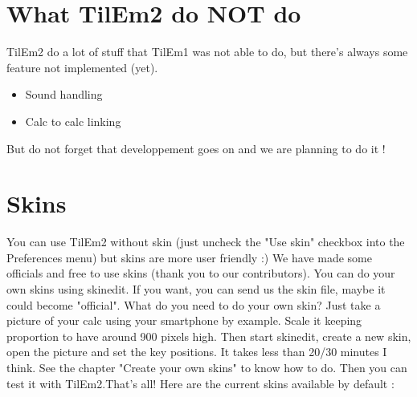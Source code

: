 \documentclass[10pt]{report}
\begin{document}
\section{What TilEm2 do NOT do}
TilEm2 do a lot of stuff that TilEm1 was not able to do, but there's always some feature not implemented (yet).\newline
\begin{itemize}
\item Sound handling
\item Calc to calc linking
\end{itemize}
But do not forget that developpement goes on and we are planning to do it !\newline



\section{Skins}
You can use TilEm2 without skin (just uncheck the "Use skin" checkbox into the Preferences menu) but skins are more user friendly :)\newline
We have made some officials and free to use skins (thank you to our contributors).\newline
You can do your own skins using skinedit. If you want, you can send us the skin file, maybe it could become "official".\newline\newline
What do you need to do your own skin?\newline
Just take a picture of your calc using your smartphone by example.\newline
Scale it keeping proportion to have around 900 pixels high.\newline
Then start skinedit, create a new skin, open the picture and set the key positions.\newline
It takes less than 20/30 minutes I think.\newline
See the chapter "Create your own skins" to know how to do.\newline
Then you can test it with TilEm2.That's all!\newline
Here are the current skins available by default :\newline
\end{document}
